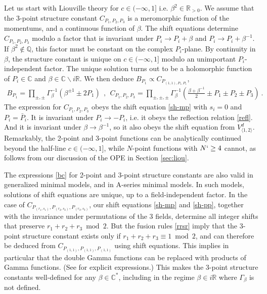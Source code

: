 \documentclass[12pt, a4paper]{article}
\theoremstyle{break}
\begin{document}
Let us start with Liouville theory for $c\in (-\infty ,1]$ i.e. $\beta^2\in\mathbb{R}_{>0}$. 
We assume that the 3-point structure constant $C_{P_1,P_2,P_3}$ is a meromorphic function of the momentums, and a continuous function of $\beta$. 
The shift equations determine $C_{P_1,P_2,P_3}$ modulo a factor that is invariant under $P_i\to P_i+\beta$ and $P_i\to P_i+\beta^{-1}$. 
If $\beta^2\notin \mathbb{Q}$, this factor must be constant on the complex $P_i$-plane. By continuity in $\beta$, the structure constant is unique on $c\in (-\infty,1]$ modulo an unimportant $P_i$-independent factor. The unique solution turns out to be a holomorphic function of $P_i\in\mathbb{C}$ and $\beta\in \mathbb{C}\backslash i\mathbb{R}$. We then deduce $B_{P_1}\propto C_{P_{(1,1),P_1,P_1}}$,
\begin{align}
 \boxed{B_{P_1} = \prod_{\pm,\pm}\Gamma_\beta^{-1}\left(\beta^{\pm 1}\pm 2P_1\right)} 
  \ \  , \ \
  \boxed{C_{P_1,P_2,P_3} =\prod_{\pm,\pm,\pm} \Gamma_\beta^{-1}\left(\tfrac{\beta+\beta^{-1}}{2} \pm P_1\pm P_2\pm P_3\right)}
 \ . 
 \label{bc}
\end{align}
The expression for $C_{P_1,P_2,P_3}$ obeys the shift equation \eqref{sh-mp} with $s_i=0$ and $P_i=\bar P_i$.
It is invariant under $P_i\to -P_i$, i.e. it obeys the reflection relation \eqref{refl}.
And it is invariant under $\beta \to \beta^{-1}$, so it also obeys the shift equation from $V^d_{\langle 1,2\rangle}$. 
Remarkably, the 2-point and 3-point functions can be analytically continued beyond the half-line $c\in (-\infty ,1]$, while $N$-point functions with $N`\geq 4$ cannot, as follows from our discussion of the OPE in Section \ref{sec:liou}. 

The expressions \eqref{bc} for 2-point and 3-point structure constants are also valid in generalized minimal models, and in A-series minimal models. In such models, solutions of shift equations are unique, up to a field-independent factor. In the case of $C_{P_{(r_1,s_1)},P_{(r_2,s_2)},P_{(r_3,s_3)}}$, our shift equations \eqref{sh-mp} and \eqref{sh-pp}, together with the invariance under permutations of the 3 fields, determine all integer shifts that preserve $r_1+r_2+r_3\bmod 2$. But the fusion rules \eqref{rrsr} imply that the 3-point structure constant exists only if $r_1+r_2+r_3\equiv 1\bmod 2$, and can therefore be deduced from $C_{P_{(1,1)},P_{(1,1)},P_{(1,1)}}$ using shift equations. This implies in particular that the double Gamma functions can be replaced with products of Gamma functions. (See \cite[Section 3.2.1]{rib14} for explicit expressions.) This makes the 3-point structure constants well-defined for any $\beta\in \mathbb{C}^*$, including in the regime $\beta\in i\mathbb{R}$ where $\Gamma_\beta$ is not defined.
\end{document}
